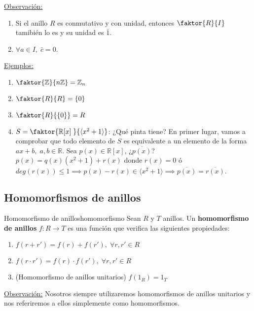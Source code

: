 \documentclass[10pt, a4paper]{article}
\newcommand{\R}{\mathbb{R}}
\newcommand{\Z}{\mathbb{Z}}
\newcommand{\obs}{\underline{Observación:} }
\newcommand{\ejs}{\underline{Ejemplos:} }
\newenvironment{enumerater}{\begin{enumerate}[label=\roman*)]}
{\end{enumerate}}
\newenvironment{enumeratea}{\begin{enumerate}[label=\arabic*)]}
{\end{enumerate}}
\begin{document}
		
\obs 
\begin{enumerate}
	\item Si el anillo $R$ es conmutativo y con unidad, entonces $\faktor{R}{I}$ tamibién lo es y su unidad es $\bar{1}$.
	\item $\forall a \in I, \; \bar{c} = 0$.
\end{enumerate}

\ejs 
\begin{enumeratea}
	\item $\faktor{\Z}{n\Z} = \Z_n$
	\item $\faktor{R}{R} = \{0\}$
	\item $\faktor{R}{\{0\}} = R$
	\item $S = \faktor{\R[x] \;}{\langle x^2 + 1 \rangle}$: ¿Qué pinta tiene? En primer lugar, vamos a comprobar que todo elemento de $S$ es equivalente a un elemento de la forma $ax + b, \; a, b \in \R$.
	Sea $p(x) \in \R[x]$, ¿$\overline{p(x)}$? $p(x) = q(x)(x^2 + 1) + r(x)$ donde $r(x) = 0$ ó $deg(r(x)) \leq 1 \implies p(x) - r(x) \in \langle x^2 + 1 \rangle \implies \overline{p(x)} = \overline{r(x)}$.
\end{enumeratea}


\subsection{Homomorfismos de anillos}

\vspace{3mm}

\begin{definition}{Homomorfismo de anillos}{homomorfismo}
Sean $R$ y $T$ anillos. Un \textbf{homomorfismo de anillos} $f : R \longrightarrow T$ es una función que verifica las siguientes propiedades:

\begin{enumerater}
	\item $f(r + r') = f(r) + f(r'), \; \forall r, r' \in R$
	\item $f(r \cdot r') = f(r) \cdot f(r'), \; \forall r, r' \in R$
	\item (Homomorfismo de anillos unitarios) $f(1_R) = 1_T$
\end{enumerater}

\obs Nosotros siempre utilizaremos homomorfismos de anillos unitarios y nos referiremos a ellos simplemente como homomorfismos.

\end{definition}
\end{document}
